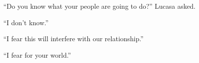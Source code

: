 ``Do you know what your people are going to do?'' Lucasa asked.

``I don't know.''

``I fear this will interfere with our relationship.''

``I fear for your world.''

%

\breakpoint
